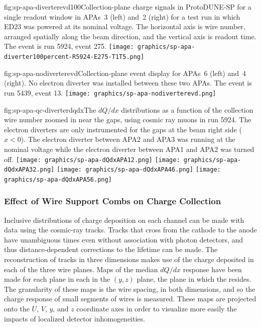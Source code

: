 \begin{dunefigure}{fig:sp-apa-diverterevd100}{Collection-plane charge signals in ProtoDUNE-SP for a single readout window in APAs~3 (left) and~2 (right) for a test run in which ED23 was powered at its nominal voltage.  The horizontal axis is wire number, arranged spatially along the beam direction, and the vertical axis is readout time.  The event is run 5924, event 275.}
    \texttt{[image: graphics/sp-apa-diverter100percent-R5924-E275-T1T5.png]}
\end{dunefigure}

\begin{dunefigure}{fig:sp-apa-nodiverterevd}{Collection-plane event display for APAs~6 (left) and~4 (right). No electron diverter was installed between these two APAs.  The event is run 5439, event 13.}
    \texttt{[image: graphics/sp-apa-nodiverterevd.png]}
\end{dunefigure}

\begin{dunefigure}
{fig:sp-apa-qc-diverterdqdx}{The $dQ/dx$ distributions as a function of the collection wire number zoomed in near the gaps, using cosmic ray muons in  run 5924. The electron diverters are only instrumented for the gaps at the beam right side ($x<0$). The electron diverter between APA2 and APA3 was running at the nominal voltage while the electron diverter between APA1 and APA2 was turned off. }
\texttt{[image: graphics/sp-apa-dQdxAPA12.png]}
\texttt{[image: graphics/sp-apa-dQdxAPA32.png]}
\texttt{[image: graphics/sp-apa-dQdxAPA46.png]}
\texttt{[image: graphics/sp-apa-dQdxAPA56.png]}
\end{dunefigure}
    



\subsubsection{Effect of Wire Support Combs on Charge Collection}
\label{sec:fdsp-apa-qa-protodune-ops-combs-charge}

Inclusive distributions of charge deposition on each channel can be made with  data using the cosmic-ray tracks.  Tracks that cross from the cathode to the anode have unambiguous times even without association with photon detectors, and thus distance-dependent corrections to the lifetime can be made.  The reconstruction of tracks in three dimensions makes use of the charge deposited in each of the three wire planes.  Maps of the median $dQ/dx$ response have been made for each plane in each  in the $(y,z)$ plane, the plane in which the  resides.  The granularity of these maps is the wire spacing, in both dimensions, and so the charge response of small segments of wires is measured.  These maps are projected onto the $U$, $V$, $y$, and $z$ coordinate axes in order to visualize more easily the impacts of localized detector inhomogeneities.

